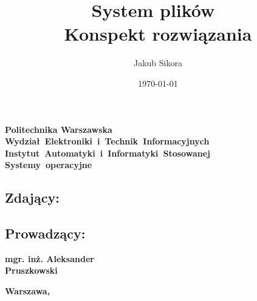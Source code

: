 \documentclass{mwrep}
\title{\bf System plików \\ Konspekt rozwiązania \vskip 0.1cm}
\author{Jakub Sikora}
\date{\today}
\begin{document}
\makeatletter
\renewcommand{\maketitle}{\begin{titlepage}
		\begin{center}{
				\LARGE {\bf Politechnika Warszawska}}\\
            \vspace{0.4cm}
            \leftskip-0.9cm
            {\LARGE {\bf \mbox{Wydział Elektroniki i Technik Informacyjnych}}}\\
            \vspace{0.2cm}
            {\LARGE {\bf \mbox{Instytut Automatyki i Informatyki Stosowanej}}}\\
            
            \vspace{5cm}
            \leftskip1.9cm
			{\bf \Huge \mbox{Systemy operacyjne} \vskip 0.1cm}
		\end{center}
		\vspace{0.1cm}

		\begin{center}
			{\bf \LARGE \@title}
		\end{center}

		\vspace{10cm}
		\begin{paracol}{2}
			\addtocontents{toc}{\protect\setcounter{tocdepth}{1}}
			\subsection*{Zdający:}
			\bf{ \Large{ \noindent\@author \par}}
			\addtocontents{toc}{\protect\setcounter{tocdepth}{2}}

			\switchcolumn \addtocontents{toc}{\protect\setcounter{tocdepth}{1}}
			\subsection*{Prowadzący:}
			\bf{\Large{\noindent mgr. inż. Aleksander \\ Pruszkowski}}
			\addtocontents{toc}{\protect\setcounter{tocdepth}{2}}

		\end{paracol}
		\vspace*{\stretch{6}}
		\begin{center}
			\bf{\large{Warszawa, \@date\vskip 0.1cm}}
		\end{center}
	\end{titlepage}
}
\makeatother
\maketitle
\end{document}
